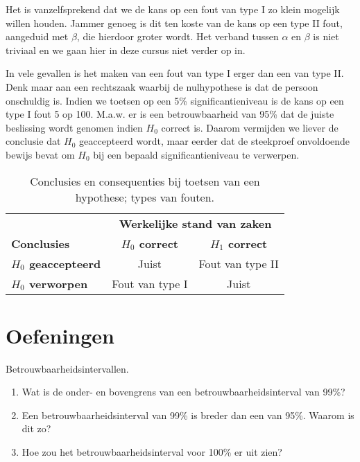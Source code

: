 Het is vanzelfsprekend dat we de kans op een fout van type I zo klein mogelijk willen houden. Jammer genoeg is dit ten koste van de kans op een type II fout, aangeduid met $\beta$, die hierdoor groter wordt. Het verband tussen $\alpha$ en $\beta$ is niet triviaal en we gaan hier in deze cursus niet verder op in.

In vele gevallen is het maken van een fout van type I erger dan een van type II. Denk maar aan een rechtszaak waarbij de nulhypothese is dat de persoon onschuldig is. Indien we toetsen op een 5\% significantieniveau is de kans op een type I fout 5 op 100. M.a.w. er is een betrouwbaarheid van 95\% dat de juiste beslissing wordt genomen indien $H_{0}$ correct is. Daarom vermijden we liever de conclusie dat $H_{0}$ geaccepteerd wordt, maar eerder dat de steekproef onvoldoende bewijs bevat om $H_{0}$ bij een bepaald significantieniveau te verwerpen.

\begin{table}
  \centering
  \begin{tabular}{@{}l|cc@{}}
    \toprule
    & \multicolumn{2}{c}{\textbf{Werkelijke stand van zaken}} \\
    \textbf{Conclusies}          & \textbf{$H_{0}$ correct} & \textbf{$H_{1}$ correct}     \\
    \midrule
    \textbf{$H_{0}$ geaccepteerd}& Juist                    & Fout van type II \\
    \textbf{$H_{0}$ verworpen}   & Fout van type I          & Juist            \\
    \bottomrule
  \end{tabular}
  \caption{Conclusies en consequenties bij toetsen van een hypothese; types van fouten.}
  \label{tab:hypfouten}
\end{table}

\section{Oefeningen}
\label{sec:toetsingsprocedures-oefeningen}

\begin{exercise}
  Betrouwbaarheidsintervallen.
  
  \begin{enumerate}
    \item Wat is de onder- en bovengrens van een betrouwbaarheidsinterval van 99\%?
    \item Een betrouwbaarheidsinterval van 99\% is breder dan een van 95\%. Waarom is dit zo?
    \item Hoe zou het betrouwbaarheidsinterval voor 100\% er uit zien?
  \end{enumerate}
  
\end{exercise}


